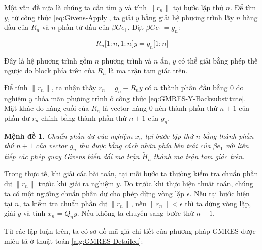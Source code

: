 \documentclass[14pt, a4paper]{article}
\numberwithin{equation}{section}
\numberwithin{algorithm}{section}
\numberwithin{figure}{section}
\newtheorem{md}{Mệnh đề}
\numberwithin{dl}{section}
\numberwithin{md}{section}
\numberwithin{bd}{section}
\numberwithin{dn}{section}
\numberwithin{hq}{section}
\begin{document}
Một vấn đề nữa là chúng ta cần tìm $y$ và tính $\lVert r_n \rVert$ tại bước lặp thứ $n$.
Để tìm $y$, từ công thức \ref{eq:Givens-Apply}, ta giải $y$ bằng giải hệ phương trình lấy $n$ hàng đầu của $R_n$ và $n$ phần tử đầu của $\beta G e_1$. Đặt $\beta G e_1 = g_n$:

\begin{equation} \label{eq:GMRES-Y-Backsubstitute}
    R_n \lbrack 1:n,1:n \rbrack y = g_n \lbrack 1:n \rbrack
\end{equation}

Đây là hệ phương trình gồm $n$ phương trình và $n$ ẩn, $y$ có thể giải bằng phép thế ngược do block phía trên của $R_n$ là ma trận tam giác trên.

Để tính $\lVert r_n \rVert$, ta nhận thấy $r_n=g_n - R_n y$ có $n$ thành phần đầu bằng 0 do nghiệm $y$ thỏa mãn phương trình ở công thức \ref{eq:GMRES-Y-Backsubstitute}. Mặt khác do hàng cuối của $R_n$ là vector hàng 0 nên thành phần thứ $n+1$ của phần dư $r_n$ chính bằng thành phần thứ $n+1$ của $g_n$.

\begin{md}
    Chuẩn phần dư của nghiệm $x_n$ tại bước lặp thứ $n$ bằng thành phần thứ $n+1$ của vector $g_n$ thu được bằng cách nhân phía bên trái của $\beta e_1$ với liên tiếp các phép quay Givens biến đổi ma trận $\widetilde{H}_n$ thành ma trận tam giác trên.
\end{md}

Trong thực tế, khi giải các bài toán, tại mỗi bước ta thường kiểm tra chuẩn phần dư $\lVert r_n \rVert$ trước khi giải ra nghiệm $y$. Do trước khi thực hiện thuật toán, chúng ta có một ngưỡng chuẩn phần dư cho phép dừng vòng lặp $\epsilon$. Nếu tại bước hiện tại $n$, ta kiểm tra chuẩn phần dư $\lVert r_n \rVert$, nếu $\lVert r_n \rVert < \epsilon$ thì ta dừng vòng lặp, giải $y$ và tính $x_n=Q_n y$. Nếu không ta chuyển sang bước thứ $n+1$.

Từ các lập luận trên, ta có sơ đồ mã giả chi tiết của phương pháp GMRES được miêu tả ở thuật toán \ref{alg:GMRES-Detailed}:
\end{document}
